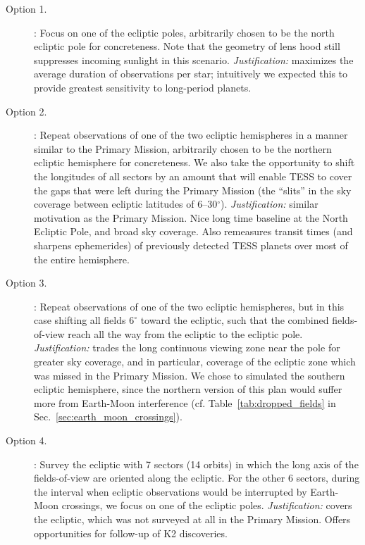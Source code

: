 \begin{description}

\item[Option 1.] \npole: Focus on one of the ecliptic poles,
  arbitrarily chosen to be the north ecliptic pole for
  concreteness. Note that the geometry of \tesss lens hood still
  suppresses incoming sunlight in this scenario.
  \textit{Justification:} maximizes the average duration of
  observations per star; intuitively we expected this to provide
  greatest sensitivity to long-period planets.

\item[Option 2.] \nhemi: Repeat observations of one of the two
  ecliptic hemispheres in a manner similar to the Primary Mission,
  arbitrarily chosen to be the northern ecliptic hemisphere for
  concreteness. We also take the opportunity to shift the longitudes
  of all sectors by an amount that will enable TESS to cover the gaps
  that were left during the Primary Mission (the ``slits'' in the sky
  coverage between ecliptic latitudes of 6--30$^\circ$).
  \textit{Justification:} similar motivation as the Primary Mission.
  Nice long time baseline at the North Ecliptic Pole, and broad sky
  coverage. Also remeasures transit times (and sharpens ephemerides)
  of previously detected TESS planets over most of the entire
  hemisphere.

\item[Option 3.] \shemiAvoid: Repeat observations of one of the two
  ecliptic hemispheres, but in this case shifting all fields $6^\circ$
  toward the ecliptic, such that the combined fields-of-view reach all
  the way from the ecliptic to the ecliptic pole.
  \textit{Justification:} trades the long continuous viewing zone near
  the pole for greater sky coverage, and in particular, coverage of
  the ecliptic zone which was missed in the Primary Mission.  We chose
  to simulated the southern ecliptic hemisphere, since the northern
  version of this plan would suffer more from Earth-Moon interference
  (cf. Table~\ref{tab:dropped_fields} in
  Sec.~\ref{sec:earth_moon_crossings}).
  
\item[Option 4.] \elong: Survey the ecliptic with 7 sectors (14
  orbits) in which the long axis of the fields-of-view are oriented
  along the ecliptic.  For the other 6 sectors, during the interval
  when ecliptic observations would be interrupted by Earth-Moon
  crossings, we focus on one of the ecliptic poles.
  \textit{Justification:} covers the ecliptic, which was not surveyed
  at all in the Primary Mission.  Offers opportunities for follow-up
  of K2 discoveries.
  

\end{description}
